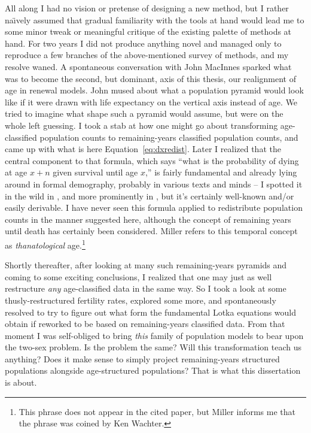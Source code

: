 All along I had no vision or pretense of designing a new method, but I rather
na\"{\i}vely assumed that gradual familiarity with the tools at hand would lead
me to some minor tweak or meaningful critique of the existing palette of methods at
hand. For two years I did not produce anything novel and managed only to
reproduce a few branches of the above-mentioned survey of methods, and my
resolve waned. A spontaneous conversation with John MacInnes sparked
what was to become the second, but dominant, axis of this thesis, our
realignment of age in renewal models. John
mused about what a population pyramid would look like if it were drawn with
life expectancy on the vertical axis instead of age. We tried to imagine what
shape such a pyramid would assume, but were on the whole left guessing. I took a
stab at how one might go about transforming age-classified population counts to
remaining-years classified population counts, and came up with what is here
Equation~\ref{eq:dxredist}. Later I realized that the central component to that
formula, which says ``what is the probability of dying at age $x+n$ given
survival until age $x$,'' is fairly fundamental and already lying around in
formal demography, probably in various texts and minds -- I spotted it in the
wild in \citet{vaupel2009life}, and more prominently in
\citet{miller2001increasing}, but it's certainly well-known and/or easily
derivable. I have never seen this formula applied to redistribute population counts in the manner
suggested here, although the concept of remaining years until death has
certainly been considered. Miller refers to this
temporal concept as \textit{thanatological} age.\footnote{This phrase does not
appear in the cited paper, but Miller informs me that the phrase was
coined by Ken Wachter.}

Shortly thereafter, after looking at many such remaining-years pyramids and
coming to some exciting conclusions, I realized that one may just as well
restructure \textit{any} age-classified data in the same way. So I took a 
look at some thusly-restructured fertility rates, explored
some more, and spontaneously resolved to try to figure out what form the
fundamental Lotka equations would obtain if reworked to be based on
remaining-years classified data. From that moment I was self-obliged to 
bring \textit{this} family of
population models to bear upon the two-sex problem. Is the problem the same?
Will this transformation teach us anything? Does it make sense to simply
project remaining-years structured populations alongside age-structured
populations? That is what this dissertation is about.

